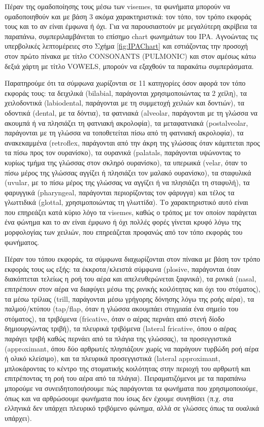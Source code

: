 Πέραν της ομαδοποίησης τους μέσω των visemes, τα φωνήματα μπορούν να ομαδοποιηθούν και με βάση 3 ακόμα χαρακτηριστικά: τον τόπο, τον τρόπο εκφοράς τους και το αν είναι έμφωνα ή όχι. Για να παρουσιαστούν με μεγαλύτερη ακρίβεια τα παραπάνω, συμπεριλαμβάνεται το επίσημο chart φωνημάτων του IPA. Αγνοώντας τις υπερβολικές λεπτομέρειες στο Σχήμα \ref{fig:IPAChart} και εστιάζοντας την προσοχή στον πρώτο πίνακα με τίτλο CONSONANTS (PULMONIC) και στον αμέσως κάτω δεξιά χάρτη με τίτλο VOWELS, μπορούν να εξαχθούν τα παρακάτω συμπεράσματα.

Παρατηρούμε ότι τα σύμφωνα χωρίζονται σε 11 κατηγορίες όσον αφορά τον τόπο εκφοράς τους: τα δειχιλικά (bilabial, παράγονται χρησιμοποιώντας τα 2 χείλη), τα χειλοδοντικά (labiodental, παράγονται με τη συμμετοχή χειλιών και δοντιών), τα οδοντικά (dental, με τα δόντια), τα φατνιακά (alveolar, παράγονται με τη γλώσσα να ακουμπά ή να πλησιάζει τη φατνιακή ακρολοφία), τα μεταφατνιακά (postalveolar, παράγονται με τη γλώσσα να τοποθετείται πίσω από τη φατνιακή ακρολοφία), τα ανακεκαμμένα (retroflex, παράγονται από την άκρη της γλώσσας όταν κάμπτεται προς τα πίσω προς τον ουρανίσκο), τα ουρανικά (palatals, παράγονται υψώνοντας το κυρίως τμήμα της γλώσσας στον σκληρό ουρανίσκο), τα υπερωικά (velar, όταν το πίσω μέρος της γλώσσας αγγίζει ή πλησιάζει τον μαλακό ουρανίσκο), τα σταφυλικά (uvular, με το πίσω μέρος της γλώσσας να αγγίζει ή να πλησιάζει τη σταφυλή), τα φαρυγγικά (pharyngeal, παράγονται περιορίζοντας τον φάρυγγα) και τέλος τα γλωττιδικά (glottal, χρησιμοποιώντας τη γλωττίδα). Το χαρακτηριστικό αυτό είναι που επηρεάζει κατά κύριο λόγο τα visemes, καθώς ο τρόπος με τον οποίον παράγεται ένα φώνημα και το αν είναι έμφωνο ή όχι πολλές φορές γίνεται κρυφό λόγω της μορφολογίας των χειλιών, που επηρεάζεται προφανώς από τον τόπο εκφοράς του φωνήματος.

Πέραν του τόπου εκφοράς, τα σύμφωνα διαχωρίζονται στον πίνακα με βάση τον τρόπο εκφοράς τους ως εξής: τα έκκροτα/κλειστά σύμφωνα (plosive, παράγονται όταν διακόπτεται τελείως η ροή του αέρα και απελευθερώνεται ξαφνικά), τα ρινικά (nasal, επιτρέπουν στον αέρα να διαφύγει μέσω της ρινικής κοιλότητας και όχι του στόματος), τα μέσω τρίλιας (trill, παράγονται μέσω γρήγορης δόνησης λόγω της ροής αέρα), τα παλμού/κτύπου (tap/flap, όταν η γλώσσα ακουμπάει στιγμιαία ένα σημείο του στόματος), τα τριβόμενα (fricative, όταν ο αέρας περνάει από στενή δίοδο δημιουργώντας τριβή), τα πλευρικά τριβόμενα (lateral fricative, όπου ο αέρας παράγει τριβή καθώς περνάει από τα πλάγια της γλώσσας), τα προσεγγιστικά (approximant, όπου δύο αρθρωτές πλησιάζουν χωρίς να παράγουν τυρβώδη ροή αέρα ή ολικό κλείσιμο), και τα πλευρικά προσεγγιστικά (lateral approximant, μπλοκάροντας το κέντρο της στοματικής κοιλότητας στην περιοχή του αρθρωτή και επιτρέποντας τη ροή του αέρα από τα πλάγια). Πειραματιζόμενοι με τα παραπάνω μπορούμε να συνειδητοποιήσουμε πώς παράγονται τα φωνήματα που χρησιμοποιούμε, όπως και να αρθρώσουμε φωνήματα που ίσως δεν έχουμε συνηθίσει (π.χ. στα ελληνικά δεν υπάρχει πλευρικό τριβόμενο φώνημα, αλλά σε γλώσσες όπως τα ουαλικά υπάρχει).

